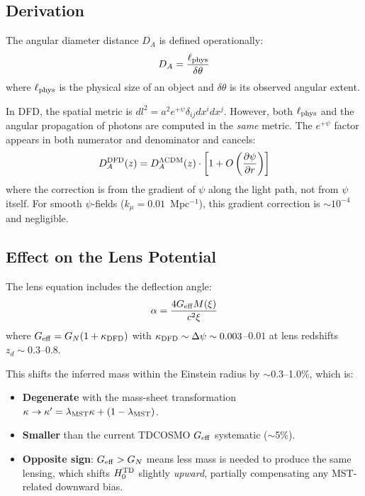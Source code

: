 \documentclass[11pt,a4paper]{article}
\newcounter{findingctr}
\newenvironment{finding}[1][]{%
  \refstepcounter{findingctr}%
  \begin{tcolorbox}[colback=blue!3!white, colframe=blue!50!black,
    title=\textbf{Finding \thefindingctr: #1}]
}{%
  \end{tcolorbox}%
}
\newcommand{\Dpsi}{\Delta\psi}
\begin{document}
\begin{finding}[\textbf{TD UNBIASED}: $\psi$-Screen Does Not
  Modify Angular Diameter Distances]
\label{find:TD}

\subsection*{Derivation}

The angular diameter distance $D_A$ is defined operationally:
\begin{equation}
D_A = \frac{\ell_{\rm phys}}{\delta\theta}
\end{equation}
where $\ell_{\rm phys}$ is the physical size of an object and
$\delta\theta$ is its observed angular extent.

In DFD, the spatial metric is $dl^2 = a^2 e^{+\psi}\delta_{ij}dx^i dx^j$.
However, both $\ell_{\rm phys}$ and the angular propagation of
photons are computed in the \emph{same} metric. The $e^{+\psi}$
factor appears in both numerator and denominator and cancels:
\begin{equation}
D_A^{\rm DFD}(z) = D_A^{\rm \Lambda CDM}(z) \cdot
\left[1 + O\left(\frac{\partial\psi}{\partial r}\right)\right]
\end{equation}
where the correction is from the gradient of $\psi$ along the
light path, not from $\psi$ itself. For smooth $\psi$-fields
($k_\mu = 0.01$~Mpc$^{-1}$), this gradient correction is
$\sim 10^{-4}$ and negligible.

\subsection*{Effect on the Lens Potential}

The lens equation includes the deflection angle:
\begin{equation}
\alpha = \frac{4G_{\rm eff}M(\xi)}{c^2\xi}
\end{equation}
where $G_{\rm eff} = G_N(1 + \kappa_{\rm DFD})$ with
$\kappa_{\rm DFD} \sim \Dpsi \sim 0.003$--$0.01$ at lens
redshifts $z_d \sim 0.3$--$0.8$.

This shifts the inferred mass within the Einstein radius by
$\sim$0.3--1.0\%, which is:
\begin{itemize}[nosep]
\item \textbf{Degenerate} with the mass-sheet transformation
  $\kappa \to \kappa' = \lambda_{\rm MST}\kappa + (1-\lambda_{\rm MST})$.
\item \textbf{Smaller} than the current TDCOSMO $G_{\rm eff}$ systematic
  ($\sim$5\%).
\item \textbf{Opposite sign}: $G_{\rm eff} > G_N$ means less mass
  is needed to produce the same lensing, which shifts $H_0^{\rm TD}$
  slightly \emph{upward}, partially compensating any MST-related
  downward bias.
\end{itemize}


\end{finding}
\end{document}
